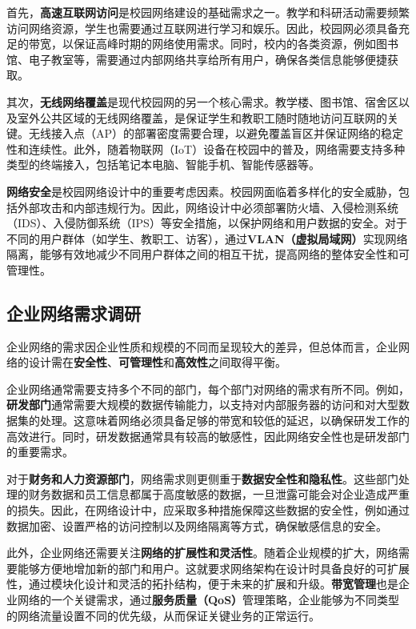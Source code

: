 \documentclass[12pt]{article}
\begin{document}
首先，\textbf{高速互联网访问}是校园网络建设的基础需求之一。教学和科研活动需要频繁访问网络资源，学生也需要通过互联网进行学习和娱乐。因此，校园网必须具备充足的带宽，以保证高峰时期的网络使用需求。同时，校内的各类资源，例如图书馆、电子教室等，需要通过内部网络共享给所有用户，确保各类信息能够便捷获取。

其次，\textbf{无线网络覆盖}是现代校园网的另一个核心需求。教学楼、图书馆、宿舍区以及室外公共区域的无线网络覆盖，是保证学生和教职工随时随地访问互联网的关键。无线接入点（AP）的部署密度需要合理，以避免覆盖盲区并保证网络的稳定性和连续性。此外，随着物联网（IoT）设备在校园中的普及，网络需要支持多种类型的终端接入，包括笔记本电脑、智能手机、智能传感器等。

\textbf{网络安全}是校园网络设计中的重要考虑因素。校园网面临着多样化的安全威胁，包括外部攻击和内部违规行为。因此，网络设计中必须部署防火墙、入侵检测系统（IDS）、入侵防御系统（IPS）等安全措施，以保护网络和用户数据的安全。对于不同的用户群体（如学生、教职工、访客），通过\textbf{VLAN（虚拟局域网）}实现网络隔离，能够有效地减少不同用户群体之间的相互干扰，提高网络的整体安全性和可管理性。

\subsection{企业网络需求调研}
企业网络的需求因企业性质和规模的不同而呈现较大的差异，但总体而言，企业网络的设计需在\textbf{安全性}、\textbf{可管理性}和\textbf{高效性}之间取得平衡。

企业网络通常需要支持多个不同的部门，每个部门对网络的需求有所不同。例如，\textbf{研发部门}通常需要大规模的数据传输能力，以支持对内部服务器的访问和对大型数据集的处理。这意味着网络必须具备足够的带宽和较低的延迟，以确保研发工作的高效进行。同时，研发数据通常具有较高的敏感性，因此网络安全性也是研发部门的重要需求。

对于\textbf{财务和人力资源部门}，网络需求则更侧重于\textbf{数据安全性和隐私性}。这些部门处理的财务数据和员工信息都属于高度敏感的数据，一旦泄露可能会对企业造成严重的损失。因此，在网络设计中，应采取多种措施保障这些数据的安全性，例如通过数据加密、设置严格的访问控制以及网络隔离等方式，确保敏感信息的安全。

此外，企业网络还需要关注\textbf{网络的扩展性和灵活性}。随着企业规模的扩大，网络需要能够方便地增加新的部门和用户。这就要求网络架构在设计时具备良好的可扩展性，通过模块化设计和灵活的拓扑结构，便于未来的扩展和升级。\textbf{带宽管理}也是企业网络的一个关键需求，通过\textbf{服务质量（QoS）}管理策略，企业能够为不同类型的网络流量设置不同的优先级，从而保证关键业务的正常运行。
\end{document}
